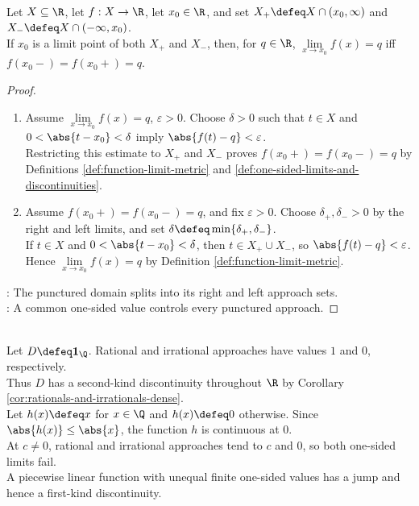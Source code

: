 \begin{proposition} \label{prop:two-sided-limit-from-one-sided-limits} \\
Let $X\subseteq\R$, let $f:X\to\R$, let $x_0\in\R$, and set $X_+\defeq X\cap(x_0,\infty)$ and $X_-\defeq X\cap(-\infty,x_0)$.\\
If $x_0$ is a limit point of both $X_+$ and $X_-$, then, for $q\in\R$, $\lim\limits_{x\to x_0}f(x)=q$ iff $f(x_0-)=f(x_0+)=q$.
\begin{proof}
\begin{enumerate}[label=\roman*.]
\setlength{\itemsep}{0pt}
\item[$(\Rightarrow)$] Assume $\lim\limits_{x\to x_0}f(x)=q$, $\varepsilon>0$. Choose $\delta>0$ such that $t\in X$ and $0<\abs{t-x_0}<\delta$ imply $\abs{f(t)-q}<\varepsilon$.\\
Restricting this estimate to $X_+$ and $X_-$ proves $f(x_0+)=f(x_0-)=q$ by Definitions \ref{def:function-limit-metric} and \ref{def:one-sided-limits-and-discontinuities}.
\item[$(\Leftarrow)$] Assume $f(x_0+)=f(x_0-)=q$, and fix $\varepsilon>0$. Choose $\delta_+,\delta_->0$ by the right and left limits, and set $\delta\defeq\min\{\delta_+,\delta_-\}$.\\
If $t\in X$ and $0<\abs{t-x_0}<\delta$, then $t\in X_+\cup X_-$, so $\abs{f(t)-q}<\varepsilon$. Hence $\lim\limits_{x\to x_0}f(x)=q$ by Definition \ref{def:function-limit-metric}.
\end{enumerate}
: The punctured domain splits into its right and left approach sets.\\
: A common one-sided value controls every punctured approach.
\end{proof}
\end{proposition}

\begin{example} \label{ex:basic-discontinuity-types} \\
Let $D\defeq\mathbf{1}_{\Q}$. Rational and irrational approaches have values $1$ and $0$, respectively.\\
Thus $D$ has a second-kind discontinuity throughout $\R$ by Corollary \ref{cor:rationals-and-irrationals-dense}.\\
Let $h(x)\defeq x$ for $x\in\Q$ and $h(x)\defeq0$ otherwise. Since $\abs{h(x)}\leq\abs{x}$, the function $h$ is continuous at $0$.\\
At $c\neq0$, rational and irrational approaches tend to $c$ and $0$, so both one-sided limits fail.\\
A piecewise linear function with unequal finite one-sided values has a jump and hence a first-kind discontinuity.
\end{example}

